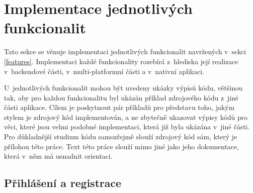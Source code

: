 \section{Implementace jednotlivých funkcionalit}

Tato sekce se věnuje implementaci jednotlivých funkcionalit navržených v~sekci \ref{features}. Implementaci každé funkcionality rozebírá z~hlediska její realizace v~backendové části, v~multi-platformní části a v~nativní aplikaci. 

U~jednotlivých funkcionalit mohou být uvedeny ukázky výpisů kódu, většinou tak, aby pro každou funkcionalitu byl ukázán příklad zdrojového kódu z~jiné části aplikace. Cílem je poskytnout pár příkladů pro představu toho, jakým stylem je zdrojový kód implementován, a ne zbytečně ukazovat výpisy kódů pro věci, které jsou velmi podobné implementaci, která již byla ukázána v~jiné části. Pro důkladnější studium kódu samozřejmě slouží zdrojový kód sám, který je přílohou této práce. Text této práce slouží mimo jiné jako jeho dokumentace, která v~něm má usnadnit orientaci.

\subsection{Přihlášení a registrace}\label{onboarding-impl}

